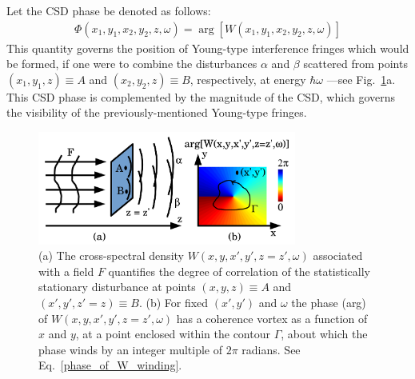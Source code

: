 \documentclass[%
 reprint,
 amsmath,amssymb,
 aps,
]{revtex4-1}
\begin{document}
Let the CSD phase be denoted as follows:
\begin{equation}
\begin{aligned}
\label{phase_of_W}
\Phi(x_1,y_1,x_2,y_2,z,\omega)=\arg[W(x_1,y_1,x_2,y_2,z,\omega)]
\end{aligned}\label{eq:CSDphase}
\end{equation}
This quantity governs the position of Young-type interference fringes which would be formed, if one were to combine the disturbances $\alpha$ and $\beta$ scattered from points $(x_1,y_1,z)\equiv A$ and $(x_2,y_2,z)\equiv B$, respectively, at energy $\hbar\omega$ \cite{mandel_wolf}---see Fig.~\ref{loss_of_fringe_visibility}a. This CSD phase is complemented by the magnitude of the CSD, which governs the visibility of the previously-mentioned Young-type fringes.

\begin{figure}
\includegraphics[width=8.5cm]{Figures/coherence_vortex.png}
\caption{(a) The cross-spectral density $W(x,y,x',y',z=z',\omega)$ associated with a field $F$ quantifies the degree of correlation of the statistically stationary disturbance at points $(x,y,z)\equiv A$ and $(x',y',z'=z)\equiv B$. (b) For fixed $(x',y')$ and $\omega$ the phase (arg) of $W(x,y,x',y',z=z',\omega)$ has a coherence vortex as a function of $x$ and $y$, at a point enclosed within the contour $\Gamma$, about which the phase winds by an integer multiple of $2\pi$ radians.  See Eq.~\ref{phase_of_W_winding}.}
\label{loss_of_fringe_visibility}
\end{figure}
\end{document}
